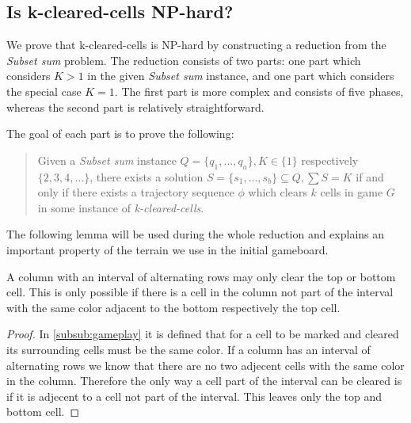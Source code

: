 \subsection{Is k-cleared-cells NP-hard?}

We prove that k-cleared-cells is NP-hard by constructing a reduction from the \textit{Subset sum} problem. The reduction consists of two parts: one part which considers $K > 1$ in the given \textit{Subset sum} instance, and one part which considers the special case $K = 1$. The first part is more complex and consists of five phases, whereas the second part is relatively straightforward.

The goal of each part is to prove the following: 

\begin{quote}
Given a \textit{Subset sum} instance $Q = \{q_1, \ldots, q_a\}, K \in \{1\}$ respectively $\{2, 3, 4, \ldots \}$, there exists a solution $S = \{s_1, \ldots, s_b \} \subseteq Q, \sum S = K$ if and only if there exists a trajectory sequence $\phi$ which clears $k$ cells in game $G$ in some instance of \textit{k-cleared-cells}.
\end{quote}



The following lemma will be used during the whole reduction and explains an important property of the terrain we use in the initial gameboard.
\\
\begin{lem}
\label{lem:alternatingrows}
A column with an interval of alternating rows may only clear the top or bottom cell. This is only possible if there is a cell in the column not part of the interval with the same color adjacent to the bottom respectively the top cell.
\end{lem}

\begin{proof}
In \ref{subsub:gameplay} it is defined that for a cell to be marked and cleared its surrounding cells must be the same color. If a column has an interval of alternating rows we know that there are no two adjecent cells with the same color in the column. Therefore the only way a cell part of the interval can be cleared is if it is adjecent to a cell not part of the interval. This leaves only the top and bottom cell.
\end{proof}










